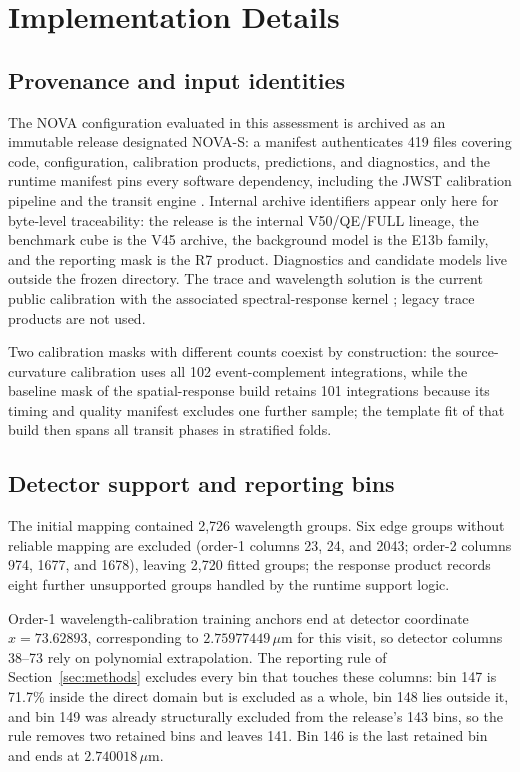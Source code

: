 \section{\nova{} Implementation Details}
\label{app:nova}

\subsection{Provenance and input identities}

The NOVA configuration evaluated in this assessment is archived as an
immutable release designated NOVA-S: a manifest authenticates 419 files
covering code, configuration, calibration products, predictions, and
diagnostics, and the runtime manifest pins every software dependency,
including the JWST calibration pipeline \citep{JWSTPipeline2025} and the
transit engine \citep{Jaxoplanet2025}. Internal archive identifiers appear only here for
byte-level traceability: the release is the internal V50/QE/FULL lineage,
the benchmark cube is the V45 archive, the background model is the E13b
family, and the reporting mask is the R7 product. Diagnostics and
candidate models live outside the frozen directory. The trace and
wavelength solution is the current public calibration
\citep{BainesEtAl2023Trace,BainesEtAl2023Wavelength} with the associated
spectral-response kernel \citep{DarveauBernierEtAl2022}; legacy trace
products are not used.

Two calibration masks with different counts coexist by construction: the
source-curvature calibration uses all 102 event-complement integrations,
while the baseline mask of the spatial-response build retains 101
integrations because its timing and quality manifest excludes one further
sample; the template fit of that build then spans all transit phases in
stratified folds.

\subsection{Detector support and reporting bins}

The initial mapping contained 2{,}726 wavelength groups. Six edge groups
without reliable mapping are excluded (order-1 columns 23, 24, and 2043;
order-2 columns 974, 1677, and 1678), leaving 2{,}720 fitted groups; the
response product records eight further unsupported groups handled by the
runtime support logic.

Order-1 wavelength-calibration training anchors end at detector coordinate
$x=73.62893$, corresponding to $2.75977449\,\mu\mathrm{m}$ for this visit,
so detector columns 38--73 rely on polynomial extrapolation. The
reporting rule of Section~\ref{sec:methods} excludes every bin that
touches these columns: bin 147 is 71.7\% inside the direct domain but is
excluded as a whole, bin 148 lies outside it, and bin 149 was already
structurally excluded from the release's 143 bins, so the rule removes two
retained bins and leaves 141. Bin 146 is the last retained bin and ends at
$2.740018\,\mu\mathrm{m}$.

